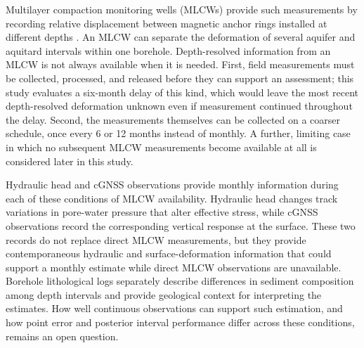 Multilayer compaction monitoring wells (MLCWs) provide such measurements by recording relative displacement between magnetic anchor rings installed at different depths \citep{hung_measuring_2021}. An MLCW can separate the deformation of several aquifer and aquitard intervals within one borehole. Depth-resolved information from an MLCW is not always available when it is needed. First, field measurements must be collected, processed, and released before they can support an assessment; this study evaluates a six-month delay of this kind, which would leave the most recent depth-resolved deformation unknown even if measurement continued throughout the delay. Second, the measurements themselves can be collected on a coarser schedule, once every 6 or 12 months instead of monthly. A further, limiting case in which no subsequent MLCW measurements become available at all is considered later in this study.

Hydraulic head and cGNSS observations provide monthly information during each of these conditions of MLCW availability. Hydraulic head changes track variations in pore-water pressure that alter effective stress, while cGNSS observations record the corresponding vertical response at the surface. These two records do not replace direct MLCW measurements, but they provide contemporaneous hydraulic and surface-deformation information that could support a monthly estimate while direct MLCW observations are unavailable. Borehole lithological logs separately describe differences in sediment composition among depth intervals and provide geological context for interpreting the estimates. How well continuous observations can support such estimation, and how point error and posterior interval performance differ across these conditions, remains an open question.


